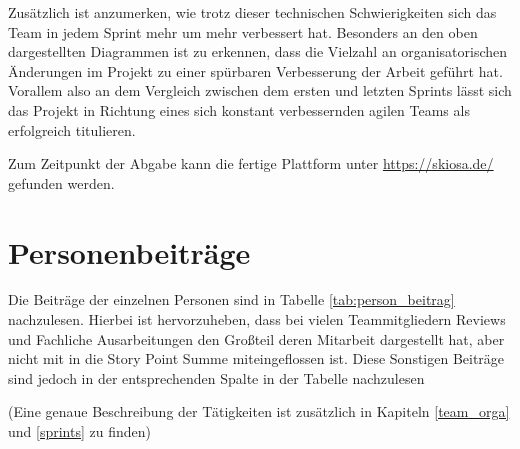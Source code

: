 Zusätzlich ist anzumerken, wie trotz dieser technischen Schwierigkeiten sich das Team in jedem Sprint mehr um mehr verbessert hat.
Besonders an den oben dargestellten Diagrammen ist zu erkennen, dass die Vielzahl an organisatorischen Änderungen im Projekt zu einer spürbaren Verbesserung der Arbeit geführt hat.
Vorallem also an dem Vergleich zwischen dem ersten und letzten Sprints lässt sich das Projekt in Richtung eines sich konstant verbessernden agilen Teams als erfolgreich titulieren.

Zum Zeitpunkt der Abgabe kann die fertige Plattform unter \url{https://skiosa.de/} gefunden werden.

\section{Personenbeiträge}
Die Beiträge der einzelnen Personen sind in Tabelle \ref{tab:person_beitrag} nachzulesen.
Hierbei ist hervorzuheben, dass bei vielen Teammitgliedern Reviews und Fachliche Ausarbeitungen den Großteil deren Mitarbeit dargestellt hat, aber nicht mit in die Story Point Summe miteingeflossen ist. 
Diese Sonstigen Beiträge sind jedoch in der entsprechenden Spalte in der Tabelle nachzulesen

\begin{table}[h]
\caption{Tabelle – Personenbeiträge} \label{tab:person_beitrag}
\end{table}
(Eine genaue Beschreibung der Tätigkeiten ist zusätzlich in Kapiteln \ref{team_orga} und \ref{sprints} zu finden)
